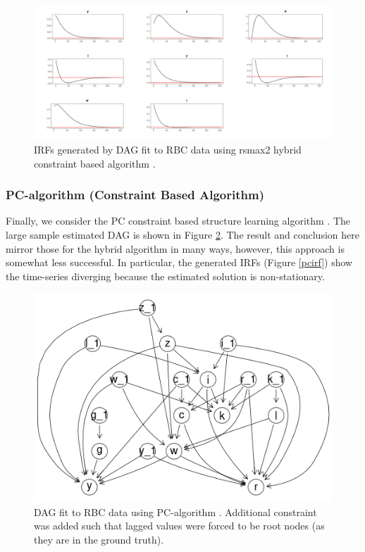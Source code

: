 \documentclass{article}
\begin{document}
\begin{figure}
  \centering  
  \includegraphics[width=0.6\linewidth]{images/rbc_hybrid_irf.png}
  \caption{IRFs generated by DAG fit to RBC data using rsmax2 hybrid constraint based algorithm \parencite{scutari2014multiple}.}
  \label{hirf}
\end{figure}

\subsubsection{PC-algorithm (Constraint Based Algorithm)} \label{pc}

Finally, we consider the PC constraint based structure learning algorithm \parencite{spirtes2000causation} \parencite{kalisch2007estimating}. The large sample estimated DAG is shown in Figure \ref{pcdag}. The result and conclusion here mirror those for the hybrid algorithm in many ways, however, this approach is somewhat less successful. In particular, the generated IRFs (Figure \ref{pcirf}) show the time-series diverging because the estimated solution is non-stationary.  

\begin{figure}
  \centering
  \includegraphics[width=0.8\linewidth]{images/rbc_constraint_dag.png}
  \caption{DAG fit to RBC data using PC-algorithm \parencite{kalisch2007estimating}. Additional constraint was added such that lagged values were forced to be root nodes (as they are in the ground truth).}
  \label{pcdag}
\end{figure}
\end{document}
